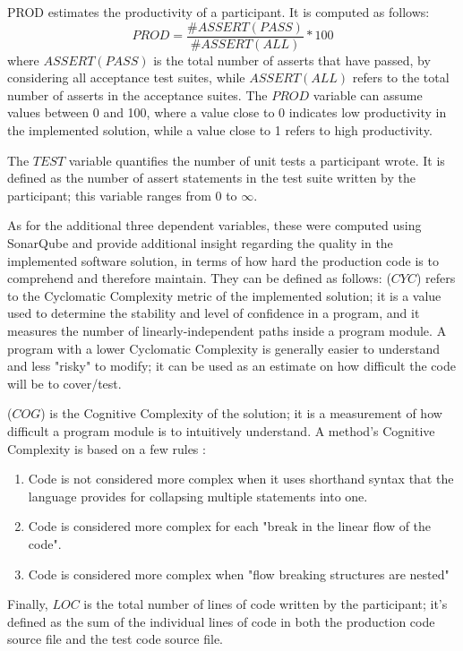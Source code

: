 PROD estimates the productivity of a participant. It is computed as follows:
\[
    PROD = \frac{\#ASSERT(PASS)}{\#ASSERT(ALL)} * 100
\]
where $ASSERT(PASS)$ is the total number of asserts that have passed, by considering all acceptance test suites, while $ASSERT(ALL)$ refers to the total number of asserts in the acceptance suites. The $PROD$ variable can assume values between 0 and 100, where a value close to 0 indicates low productivity in the implemented solution, while a value close to 1 refers to high productivity.

The $TEST$ variable quantifies the number of unit tests a participant wrote. It is defined as the number of assert statements in the test suite written by the participant; this variable ranges from 0 to $\infty$.


As for the additional three dependent variables, these were computed using SonarQube and provide additional insight regarding the quality in the implemented software solution, in terms of how hard the production code is to comprehend and therefore maintain. They can be defined as follows:
(\textbf{$CYC$}) refers to the Cyclomatic Complexity metric of the implemented solution; it is a value used to determine the stability and level of confidence in a program, and it measures the number of linearly-independent paths inside a program module. A program with a lower Cyclomatic Complexity is generally easier to understand and less "risky" to modify; it can be used as an estimate on how difficult the code will be to cover/test.

(\textbf{$COG$}) is the Cognitive Complexity of the solution; it is a measurement of how difficult a program module is to intuitively understand. A method's Cognitive Complexity is based on a few rules \cite{CognitiveComplexity}:
\begin{enumerate}
    \item Code is not considered more complex when it uses shorthand syntax that the language provides for collapsing multiple statements into one.
    \item Code is considered more complex for each "break in the linear flow of the code".
    \item Code is considered more complex when "flow breaking structures are nested"
\end{enumerate}

Finally, $LOC$ is the total number of lines of code written by the participant; it's defined as the sum of the individual lines of code in both the production code source file and the test code source file.

